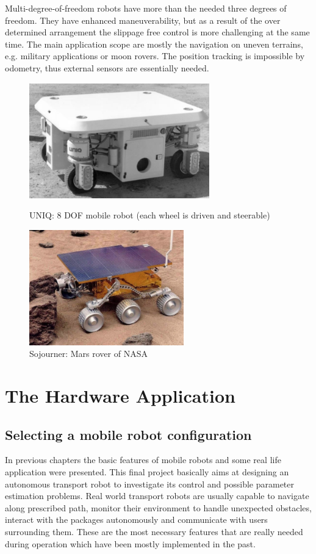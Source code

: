 \documentclass[12pt,english,twoside]{article}
\begin{document}
Multi-degree-of-freedom robots have more than the needed three degrees of freedom. They have enhanced maneuverability, but as a result of the over determined arrangement the slippage free control is more challenging at the same time. The main application scope are mostly the navigation on uneven terrains, e.g. military applications or moon rovers. The position tracking is impossible by odometry, thus external sensors are essentially needed. 

\begin{figure}[htb!]
	\centering
	\centering
	\includegraphics[height=5cm]{figures/uniq.png}
	\caption{UNIQ: 8 DOF mobile robot (each wheel is driven and steerable) \cite{rirt}}
	\endminipage\hfill
	\centering
	\includegraphics[height=5cm]{figures/rover.png}
	\caption{Sojourner: Mars rover of NASA \cite{rirt}}
	\label{mecanum}
	\endminipage\hfill
\end{figure}

\newpage
\section{The Hardware Application}
\subsection{Selecting a mobile robot configuration}
In previous chapters the basic features of mobile robots and some real life application were presented. This final project basically aims at designing an autonomous transport robot to investigate its control and possible parameter estimation problems. Real world transport robots are usually capable to navigate along prescribed path, monitor their environment to handle unexpected obstacles, interact with the packages autonomously and communicate with users surrounding them. These are the most necessary features that are really needed during operation which have been mostly implemented in the past.
\end{document}
